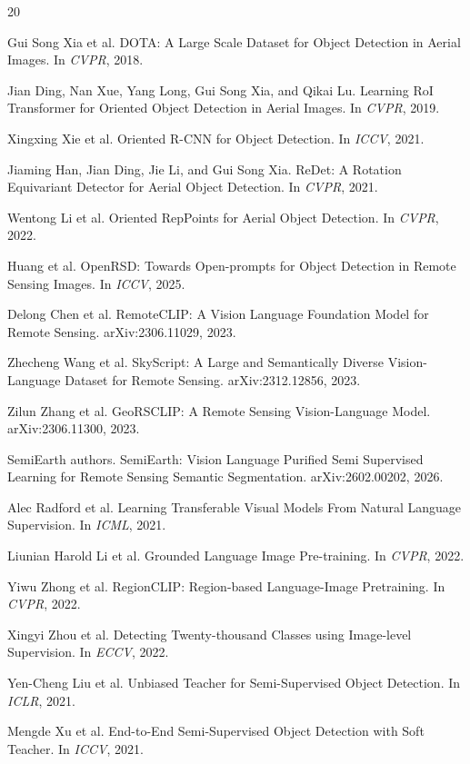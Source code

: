 \documentclass[10pt]{article}
\begin{document}
\FloatBarrier

\begin{thebibliography}{20}

Gui Song Xia et al.
\newblock DOTA: A Large Scale Dataset for Object Detection in Aerial Images.
\newblock In \emph{CVPR}, 2018.

Jian Ding, Nan Xue, Yang Long, Gui Song Xia, and Qikai Lu.
\newblock Learning RoI Transformer for Oriented Object Detection in Aerial Images.
\newblock In \emph{CVPR}, 2019.

Xingxing Xie et al.
\newblock Oriented R-CNN for Object Detection.
\newblock In \emph{ICCV}, 2021.

Jiaming Han, Jian Ding, Jie Li, and Gui Song Xia.
\newblock ReDet: A Rotation Equivariant Detector for Aerial Object Detection.
\newblock In \emph{CVPR}, 2021.

Wentong Li et al.
\newblock Oriented RepPoints for Aerial Object Detection.
\newblock In \emph{CVPR}, 2022.

Huang et al.
\newblock OpenRSD: Towards Open-prompts for Object Detection in Remote Sensing Images.
\newblock In \emph{ICCV}, 2025.

Delong Chen et al.
\newblock RemoteCLIP: A Vision Language Foundation Model for Remote Sensing.
\newblock arXiv:2306.11029, 2023.

Zhecheng Wang et al.
\newblock SkyScript: A Large and Semantically Diverse Vision-Language Dataset for Remote Sensing.
\newblock arXiv:2312.12856, 2023.

Zilun Zhang et al.
\newblock GeoRSCLIP: A Remote Sensing Vision-Language Model.
\newblock arXiv:2306.11300, 2023.

SemiEarth authors.
\newblock SemiEarth: Vision Language Purified Semi Supervised Learning for Remote Sensing Semantic Segmentation.
\newblock arXiv:2602.00202, 2026.

Alec Radford et al.
\newblock Learning Transferable Visual Models From Natural Language Supervision.
\newblock In \emph{ICML}, 2021.

Liunian Harold Li et al.
\newblock Grounded Language Image Pre-training.
\newblock In \emph{CVPR}, 2022.

Yiwu Zhong et al.
\newblock RegionCLIP: Region-based Language-Image Pretraining.
\newblock In \emph{CVPR}, 2022.

Xingyi Zhou et al.
\newblock Detecting Twenty-thousand Classes using Image-level Supervision.
\newblock In \emph{ECCV}, 2022.

Yen-Cheng Liu et al.
\newblock Unbiased Teacher for Semi-Supervised Object Detection.
\newblock In \emph{ICLR}, 2021.

Mengde Xu et al.
\newblock End-to-End Semi-Supervised Object Detection with Soft Teacher.
\newblock In \emph{ICCV}, 2021.

\end{thebibliography}
\end{document}
